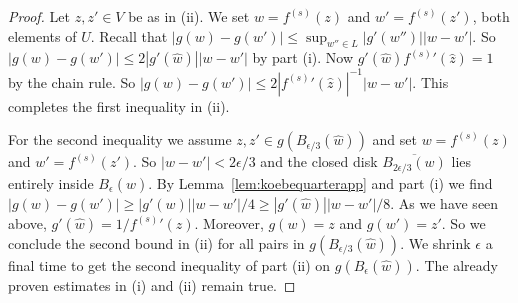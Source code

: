 \documentclass[12pt,oneside,a4]{amsart}
\numberwithin{maincounter}{section}
\numberwithin{equation}{section}
\begin{document}
\begin{proof}
    Let $z,z'\in V$ be as in (ii).
  We set $w=f^{(s)}(z)$ and $w'=f^{(s)}(z')$, both elements of $U$. 
  Recall that 
  $|g(w)-g(w')|\le  \sup_{w''\in L} |g'(w'')| |w-w'|$.
  So 
  $|g(w)-g(w')|\le 2|g'(\widehat{w})||w-w'|$ by part (i). 
  Now $g'(\widehat{w}){f^{(s)}}'(\widehat z)=1$ by the chain rule. So
  $|g(w)-g(w')|
  \le 2|{f^{(s)}}'(\widehat{z})|^{-1}|w-w'|$. 
  This completes the first inequality in (ii).

  For the second inequality we assume $z,z' \in
  g(B_{\epsilon/3}(\widehat w))$ and set
  $w=f^{(s)}(z)$ and $w'=f^{(s)}(z')$. So $|w-w'|<2\epsilon/3$ and the
  closed disk $\overline{B_{2\epsilon/3}(w)}$ lies entirely inside
  $B_\epsilon(\widehat w)$.
  By Lemma~\ref{lem:koebequarterapp} and part (i) we find
  $|g(w)-g(w')|\ge |g'(w)||w-w'|/4 \ge |g'(\widehat w)| |w-w'|/8$.
  As we have seen above, $g'(\widehat w) =1/{f^{(s)}}'(\widehat
  z)$.  Moreover, $g(w)=z$ and $g(w')=z'$. So
  we conclude the second bound in (ii) for all pairs in
  $g(B_{\epsilon/3}(\widehat w))$. We shrink $\epsilon$ a
  final time to get the second inequality of part (ii)
  on $g(B_\epsilon(\widehat w))$. The
  already proven
  estimates in (i) and (ii) remain true.
\end{proof}




%   
% 
% 
% 


%
% 


%

%


%

%





\end{document}
